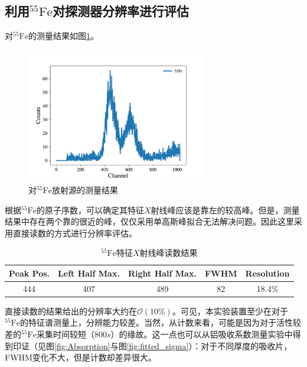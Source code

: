 \documentclass{article}
\begin{document}
    \subsection{利用$^{55}\text{Fe}$对探测器分辨率进行评估}
    对$^{55}\text{Fe}$的测量结果如图\ref{fig:55Fe}。
    \begin{figure}
        \centering
        \includegraphics[width=0.7\textwidth]{../plot/55Fe.pdf}
        \caption{对$^{55}\text{Fe}$放射源的测量结果\label{fig:55Fe}}
    \end{figure}
    根据$^{55}\text{Fe}$的原子序数，可以确定其特征$X$射线峰应该是靠左的较高峰。但是，测量结果中存在两个靠的很近的峰，仅仅采用单高斯峰拟合无法解决问题。因此这里采用直接读数的方式进行分辨率评估。
    \begin{table}[htbp]
        \centering
        \caption{$^{55}\text{Fe}$特征$X$射线峰读数结果\label{tab:55Fe}}
        \begin{tabular}{ccccc}
            \toprule
            Peak Pos. &  Left Half Max. & Right Half Max.   &     FWHM        &       Resolution  \\
            \midrule
            444  &      407 &     489 &     82 &    18.4\% \\
            \bottomrule
            \end{tabular}
    \end{table} 
    直接读数的结果给出的分辨率大约在$\mathcal{O}(10\%)$。可见，本实验装置至少在对于$^{55}\text{Fe}$的特征谱测量上，分辨能力较差。当然，从计数来看，可能是因为对于活性较差的$^{55}\text{Fe}$采集时间较短（$800\si{s}$）的缘故。这一点也可以从铝吸收系数测量实验中得到印证（见图\ref{fig:Absorption}与图\ref{fig:fitted_sigma}）：对于不同厚度的吸收片，FWHM变化不大，但是计数却差异很大。
\end{document}
